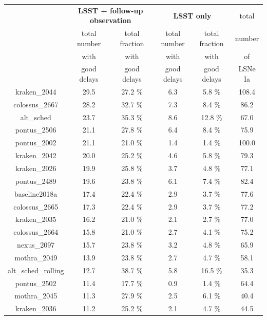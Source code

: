 \begin{table}
\centering
\begin{tabular}{c|c|c|c|c|c}
\multicolumn{1}{c}{}& \multicolumn{2}{c}{\textbf{LSST + follow-up observation}}  & \multicolumn{2}{c}{\textbf{LSST only}} & \multicolumn{1}{c}{total } \\

& total number  & total fraction  & total number  & total fraction  & number \\
&  with & with & with& with & of\\
& good delays & good delays& good delays& good delays&LSNe Ia\\
\hline
kraken\_2044 & 29.5 & 27.2 \% & 6.3 & 5.8 \% & 108.4 \\
\hline
colossus\_2667 & 28.2 & 32.7 \% & 7.3 & 8.4 \% & 86.2 \\
\hline
alt\_sched & 23.7 & 35.3 \% & 8.6 & 12.8 \% & 67.0 \\
\hline
pontus\_2506 & 21.1 & 27.8 \% & 6.4 & 8.4 \% & 75.9 \\
\hline
pontus\_2002 & 21.1 & 21.0 \% & 1.4 & 1.4 \% & 100.0\\
\hline
kraken\_2042 & 20.0 &  25.2 \% & 4.6 & 5.8 \% & 79.3 \\
\hline
kraken\_2026 & 19.9 &  25.8 \% & 3.7 & 4.8 \% & 77.1 \\
\hline
pontus\_2489 & 19.6 &  23.8 \% & 6.1 & 7.4 \% & 82.4 \\
\hline
baseline2018a & 17.4 &  22.4 \% & 2.9 & 3.7 \% & 77.6  \\
\hline
colossus\_2665 & 17.3 & 22.4 \% & 2.9 & 3.7 \% & 77.2  \\
\hline
kraken\_2035 & 16.2 &  21.0 \% & 2.1 & 2.7 \% & 77.0 \\
\hline
colossus\_2664 & 15.8 & 21.0 \% & 2.7 & 4.1 \% & 75.2  \\
\hline
nexus\_2097 & 15.7&  23.8 \% & 3.2 & 4.8 \% & 65.9 \\
\hline
mothra\_2049 & 13.9&  23.8 \% & 2.7 & 4.7 \% & 58.1\\
\hline
alt\_sched\_rolling & 12.7 &  38.7 \% & 5.8 & 16.5 \% & 35.3 \\
\hline
pontus\_2502 & 11.4 &  17.7 \% & 0.9 & 1.4 \% & 64.4 \\
\hline
mothra\_2045 & 11.3& 27.9 \% & 2.5 & 6.1 \% & 40.4\\
\hline
kraken\_2036 & 11.2 &  25.2 \% & 2.1 & 4.7 \% & 44.5 \\



\end{tabular}
\end{table}
